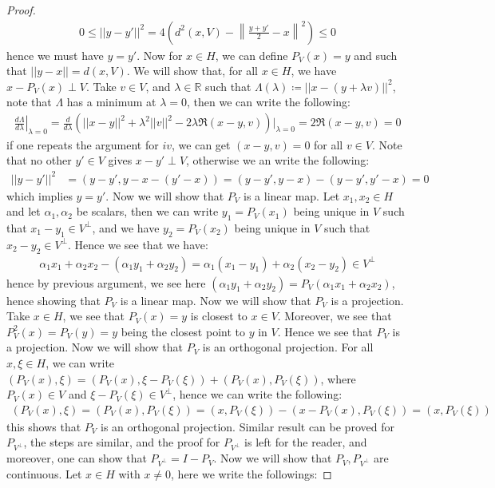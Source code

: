 \documentclass[11pt]{book}
\theoremstyle{break}
\theoremstyle{break}
\newcommand{\R}{\mathbb{R}}
\begin{document}
\begin{proof}
\begin{align*}
0 \leq ||y- y'||^2 = 4\left( d^2(x,V) - \left\| \frac{y+y'}{2}-x\right\|^2 \right) \leq 0
\end{align*}
hence we must have $y = y'$. Now for $x \in H$, we can define $P_V(x) = y$ and such that $||y - x|| = d(x,V)$. We will show that, for all $x \in H$, we have $x - P_V(x) \perp V$. Take $v \in V$, and $\lambda\in \R$ such that $\Lambda(\lambda) \coloneqq || x - (y+\lambda v)||^2$, note that $\Lambda$ has a minimum at $\lambda = 0$, then we can write the following:
\begin{align*}
\left.\frac{d\Lambda}{d\lambda}\right|_{\lambda = 0} = \frac{d}{d\lambda}\left(||x-y||^2 + \lambda^2 ||v||^2 - 2\lambda \Re(x-y,v)\right)|_{\lambda = 0}= 2\Re(x-y,v) = 0 
\end{align*}
if one repeats the argument for $iv$, we can get $(x-y,v) = 0$ for all $v \in V$. Note that no other $y' \in V$ gives $x - y' \perp V$, otherwise we an write the following:
\begin{align*}
||y - y'||^2 &= (y-y', y-x-(y'-x))= (y-y',y-x) -(y-y', y'-x) = 0
\end{align*}
which implies $y=y'$. Now we will show that $P_{V}$ is a linear map. Let $x_1,x_2\in H$ and let $\alpha_1,\alpha_2$ be scalars, then we can write $y_1 = P_V(x_1)$ being unique in $V$ such that $x_1 - y_1 \in V^{\perp}$, and we have $y_2 = P_V(x_2)$ being unique in $V$ such that $x_2 - y_2 \in V^\perp$. Hence we see that we have:
\begin{align*}
\alpha_1 x_1 + \alpha_2 x_2 - (\alpha_1 y_1 + \alpha_2 y_2) =\alpha_1 (x_1 - y_1) + \alpha_2 (x_2 - y_2) \in V^\perp
\end{align*}
hence by previous argument, we see here $(\alpha_1 y_1 + \alpha_2 y_2 ) = P_V(\alpha_1x_1 + \alpha_2 x_2)$, hence showing that $P_V$ is a linear map. Now we will show that $P_V$ is a projection. Take $x \in H$, we see that $P_V(x) = y$ is closest to $x \in V$. Moreover, we see that $P_V^2(x) = P_V(y) = y$ being the closest point to $y$ in $V$. Hence we see that $P_V$ is a projection. Now we will show that $P_V$ is an orthogonal projection. For all $x, \xi \in H$, we can write $(P_V(x), \xi) = (P_V(x) , \xi - P_V(\xi)) + (P_V(x) , P_V(\xi))$, where $P_V(x) \in V$ and $\xi - P_V(\xi) \in V^\perp$, hence we can write the following:
\begin{align*}
(P_V(x) ,\xi) = (P_V(x), P_V(\xi)) = (x, P_V(\xi)) - (x- P_V(x) , P_V(\xi)) = (x,P_V(\xi))
\end{align*}
this shows that $P_V$ is an orthogonal projection. Similar result can be proved for $P_{V^\perp}$, the steps are similar, and the proof for $P_{V^\perp}$ is left for the reader, and moreover, one can show that $P_{V^\perp} = I - P_V$. Now we will show that $P_V, P_{V^\perp}$ are continuous. Let $x \in H$ with $x \neq 0$, here we write the followings:

\end{proof}
\end{document}

